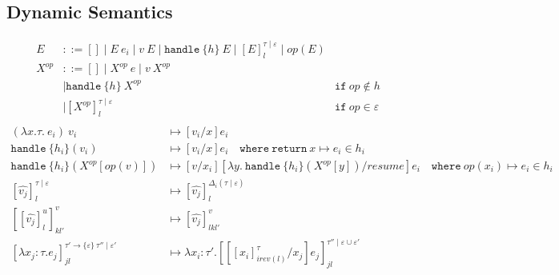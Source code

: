\documentclass{article}
\begin{document}
\subsection{Dynamic Semantics}
\begin{align*}
E &::= [] \mid E\ e_i \mid v\ E \mid \texttt{handle}\ \{h\}\ E \mid [E]^{\tau\mid\varepsilon}_l \mid op(E) \\
X^{op} &::= [] \mid X^{op}\ e \mid v\ X^{op}  \\
				&\mid \texttt{handle}\ \{h\}\ X^{op}  &  \texttt{if}\ op \not \in h \\
				&\mid [X^{op}]^{\tau \mid \varepsilon}_l  & \texttt{if}\ op\in\varepsilon \\
\end{align*}
\begin{align*}
(\lambda x.\tau.\ e_i)\ v_i &\mapsto [v_i/x]e_i  \\
\texttt{handle}\ \{h_i\}(v_i) &\mapsto [v_i/x]e_i  \quad \texttt{where}\ \texttt{return}\ x \mapsto e_i \in h_i\\
\texttt{handle}\ \{h_i\}(X^{op}[op(v)]) &\mapsto [v/x_i][\lambda y.\ \texttt{handle}\ \{h_i\}(X^{op}[y])/resume]e_i \quad \texttt{where}\ op(x_i) \mapsto e_i \in h_i\\
[\hat{v_j}]^{\tau \mid \varepsilon}_l &\mapsto [\hat{v_j}]^{\Delta_i(\tau \mid \varepsilon)}_l\\
[[\hat{v_j}]^{u}_l]^v_{kl'} &\mapsto[\hat{v_j}]^{v}_{lkl'} \\
[\lambda x_j: \tau. e_j]^{\tau' \rightarrow \{\varepsilon\}\ \tau'' \mid \varepsilon'}_{jl} &\mapsto \lambda x_i : \tau'. [[[x_i]^\tau_{irev(l)}/x_j]e_j]^{\tau'' \mid \varepsilon \cup \varepsilon'}_{jl}\\
\end{align*}
\end{document}
